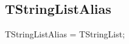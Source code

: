 \documentclass{report}
\begin{document}
\subsection*{TStringListAlias}
\begin{list}{}{
\setlength{\itemindent}{0cm}
\setlength{\listparindent}{0cm}
\setlength{\leftmargin}{\evensidemargin}
\addtolength{\leftmargin}{\tmplength}
\settowidth{\labelsep}{X}
\addtolength{\leftmargin}{\labelsep}
\setlength{\labelwidth}{\tmplength}
}
\begin{flushleft}
\item[\textbf{Declaration}\hfill]
\begin{ttfamily}
TStringListAlias = TStringList;\end{ttfamily}


\end{flushleft}
\end{list}
\end{document}
